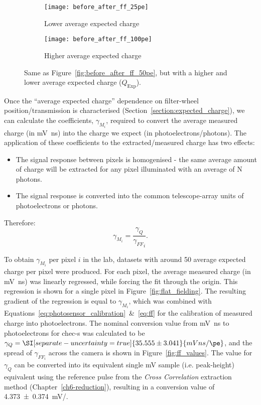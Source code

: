 \begin{figure}
  \begin{subfigure}[b]{0.49\textwidth}
    \texttt{[image: before\_after\_ff\_25pe]}
    \caption{Lower average expected charge}
    \label{fig:before_after_ff_25pe}
  \end{subfigure}
  \hfill
  \begin{subfigure}[b]{0.49\textwidth}
    \texttt{[image: before\_after\_ff\_100pe]}
    \caption{Higher average expected charge}
    \label{fig:before_after_ff_100pe}
  \end{subfigure}
  \caption[Flat-field residuals at other illuminations.]{Same as Figure~\ref{fig:before_after_ff_50pe}, but with a higher and lower average expected charge ($Q_\text{Exp}$).}
\end{figure}

Once the ``average expected charge'' dependence on filter-wheel position/transmission is characterised (Section~\ref{section:expected_charge}), we can calculate the coefficients, $\gamma_{M_i}$, required to convert the average measured charge (in \si{mV ns}) into the charge we expect (in photoelectrons/photons). The application of these coefficients to the extracted/measured charge has two effects:
\begin{itemize}
\item The signal response between pixels is homogenised - the same average amount of charge will be extracted for any pixel illuminated with an average of N photons.
\item The signal response is converted into the common telescope-array units of photoelectrons or photons.
\end{itemize}
Therefore:
\begin{equation} \label{eq:ff}
\gamma_{M_i} = \frac{\gamma_Q}{{\gamma_{FF}}_i}.
\end{equation}

To obtain $\gamma_{M_i}$ per pixel $i$ in the lab, datasets with around \SI{50}{\pe} average expected charge per pixel were produced. For each pixel, the average measured charge (in \si{mV ns}) was linearly regressed, while forcing the fit through the origin. This regression is shown for a single pixel in Figure~\ref{fig:flat_fielding}. The resulting gradient of the regression is equal to $\gamma_{M_i}$, which was combined with Equations~\ref{eq:photosensor_calibration}~\&~\ref{eq:ff} for the calibration of measured charge into photoelectrons. The nominal conversion value from \si{mV ns} to photoelectrons for \gls{chec-s} was calculated to be $\gamma_Q = \SI[separate-uncertainty = true]{35.555 \pm 3.041}{mVns/\pe}$, and the spread of $\gamma_{FF_i}$ across the camera is shown in Figure~\ref{fig:ff_values}. The value for $\gamma_Q$ can be converted into its equivalent single \si{mV} sample (i.e. peak-height) equivalent using the reference pulse from the \textit{Cross Correlation} extraction method (Chapter~\ref{ch6-reduction}), resulting in a conversion value of \SI[separate-uncertainty = true]{4.373 \pm 0.374}{mV/\pe}.

